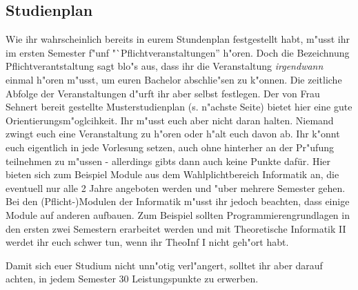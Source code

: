 \subsection{Studienplan}
\label{bach_studienplan}
Wie ihr wahrscheinlich bereits in eurem Stundenplan festgestellt habt, m"usst ihr im ersten Semester f"unf "`Pflichtveranstaltungen'' h"oren.
Doch die Bezeichnung Pflichtverantstaltung sagt blo"s aus, dass ihr die Veranstaltung \emph{irgendwann} einmal h"oren m"usst, um euren Bachelor abschlie"sen zu k"onnen.
Die zeitliche Abfolge der Veranstaltungen d"urft ihr aber selbst festlegen.
Der von Frau Sehnert bereit gestellte Musterstudienplan (s. n"achste Seite) bietet hier eine gute Orientierungsm"oglcihkeit.
Ihr m"usst euch aber nicht daran halten. Niemand zwingt euch eine Veranstaltung zu h"oren oder h"alt euch davon ab.
Ihr k"onnt euch eigentlich in jede Vorlesung setzen, auch ohne hinterher an der Pr"ufung teilnehmen zu m"ussen - allerdings gibts dann auch keine Punkte dafür.
Hier bieten sich zum Beispiel Module aus dem Wahlplichtbereich Informatik an, die eventuell nur alle 2 Jahre angeboten werden und "uber mehrere Semester gehen.
Bei den (Pflicht-)Modulen der Informatik m"usst ihr jedoch beachten, dass einige Module auf anderen aufbauen.
Zum Beispiel sollten Programmierengrundlagen in den ersten zwei Semestern erarbeitet werden und mit Theoretische Informatik II werdet ihr euch schwer tun, wenn ihr TheoInf I nicht geh"ort habt.

Damit sich euer Studium nicht unn"otig verl"angert, solltet ihr aber darauf achten, in jedem Semester 30 Leistungspunkte zu erwerben. 





